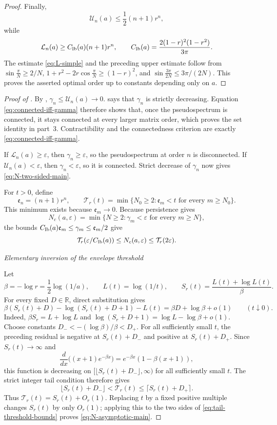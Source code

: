 \documentclass[10pt,twoside]{siamart1116}
\numberwithin{equation}{section}
\newcommand{\proofstage}[1]{%
  \par\medskip\noindent\textit{#1}\par\nobreak\smallskip}
\begin{document}
\begin{proof}
Finally,
\[
 \mathcal U_n(a)\leq\frac12(n+1)r^n,
\]
while
\begin{equation}\label{eq:L-simple}
 \mathcal L_n(a)\geq C_{\rm lb}(a)(n+1)r^n,\qquad
 C_{\rm lb}(a)=\frac{2(1-r)^2(1-r^2)}{3\pi}.
\end{equation}
The estimate \eqref{eq:L-simple} and the preceding upper estimate follow from
\(\sin\frac{\pi}{N}\geq2/N\),
\(1+r^2-2r\cos\frac{\pi}{N}\geq(1-r)^2\), and
\(\sin\frac{3\pi}{2N}\leq3\pi/(2N)\).  This proves the asserted optimal
order up to constants depending only on \(a\).
\end{proof}

\begin{proof}[Proof of ]
By ,
\(\gamma_n\leq\mathcal U_n(a)\to0\).   says that
\(\gamma_n\) is strictly decreasing.  Equation
\eqref{eq:connected-iff-gamma} therefore shows that, once the
pseudospectrum is connected, it stays connected at every larger matrix
order, which proves the set identity in part~3.  Contractibility and the
connectedness criterion are exactly \eqref{eq:connected-iff-gamma}.

If \(\mathcal L_n(a)\geq\varepsilon\), then
\(\gamma_n\geq\varepsilon\), so the pseudospectrum at order \(n\)
is disconnected.  If \(\mathcal U_n(a)<\varepsilon\), then
\(\gamma_n<\varepsilon\), so it is connected.  Strict decrease of
\(\gamma_n\) now gives \eqref{eq:N-two-sided-main}.

For \(t>0\), define
\[
 \mathfrak e_n=(n+1)r^n,\qquad
 \mathcal T_r(t)=\min\{N_0\geq2:\mathfrak e_m<t
 \text{ for every }m\geq N_0\}.
\]
This minimum exists because \(\mathfrak e_m\to0\).
Because persistence gives
\[
 N_c(a,\varepsilon)=
 \min\{N\geq2:\gamma_m<\varepsilon\text{ for every }m\geq N\},
\]
the bounds \(C_{\rm lb}(a)\mathfrak e_m\leq\gamma_m\leq\mathfrak e_m/2\)
give
\begin{equation}\label{eq:tail-threshold-bounds}
 \mathcal T_r(\varepsilon/C_{\rm lb}(a))\leq N_c(a,\varepsilon)
 \leq\mathcal T_r(2\varepsilon).
\end{equation}
\proofstage{Elementary inversion of the envelope threshold}
Let
\[
 \beta=-\log r=\frac12\log(1/a),\qquad
 L(t)=\log(1/t),\qquad
 S_r(t)=\frac{L(t)+\log L(t)}{\beta}.
\]
For every fixed \(D\in\mathbb R\), direct substitution gives
\[
 \beta(S_r(t)+D)-\log(S_r(t)+D+1)-L(t)
 =\beta D+\log\beta+o(1)
 \qquad(t\downarrow0).
\]
Indeed, \(\beta S_r=L+\log L\) and
\(\log(S_r+D+1)=\log L-\log\beta+o(1)\).
Choose constants \(D_-<-(\log\beta)/\beta<D_+\).  For all sufficiently
small \(t\), the preceding residual is negative at \(S_r(t)+D_-\) and
positive at \(S_r(t)+D_+\).  Since \(S_r(t)\to\infty\) and
\[
 \frac{d}{dx}\bigl((x+1)e^{-\beta x}\bigr)
 =e^{-\beta x}(1-\beta(x+1)),
\]
this function is decreasing on
\([\lfloor S_r(t)+D_-\rfloor,\infty)\) for all sufficiently small \(t\).
The strict integer tail condition therefore gives
\[
 \lfloor S_r(t)+D_-\rfloor<\mathcal T_r(t)
 \leq\lceil S_r(t)+D_+\rceil.
\]
Thus \(\mathcal T_r(t)=S_r(t)+O_r(1)\).  Replacing \(t\) by a fixed
positive multiple changes \(S_r(t)\) by only \(O_r(1)\); applying this to
the two sides of \eqref{eq:tail-threshold-bounds} proves
\eqref{eq:N-asymptotic-main}.


\end{proof}
\end{document}
